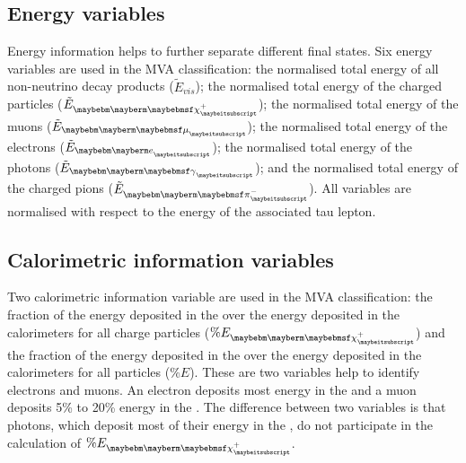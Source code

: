 
\subsection{Energy variables}

Energy information helps to further separate different final states. Six energy variables are used in the MVA classification: the normalised total energy of all non-neutrino decay products ($\tilde{E}_{vis}$); the normalised total energy of the charged particles ($\tilde{E}_{\charge}$); the normalised total energy of the muons ($\tilde{E}_{\Pmu}$); the normalised total energy of the electrons ($\tilde{E}_{\Pe}$); the normalised total energy of the photons ($\tilde{E}_{\Pgg}$); and the normalised total energy of the charged pions ($\tilde{E}_{\Pgpm}$). All variables are normalised with respect to the energy of the associated tau lepton.

\subsection{Calorimetric information variables}


Two calorimetric information variable are used in the MVA classification: the fraction of the energy  deposited in the \ECAL over the  energy deposited in the calorimeters for all charge particles ($\% E_{\charge}$) and the fraction of the energy  deposited in the \ECAL over the  energy deposited in the calorimeters for all particles ($\% E$). These are two variables help to identify electrons and muons. An electron deposits most energy in the \ECAL and a muon deposits 5\% to 20\% energy in the \ECAL. The difference between two variables is that photons, which deposit most of their energy in the \ECAL, do not participate in the calculation of $\% E_{\charge}$.




